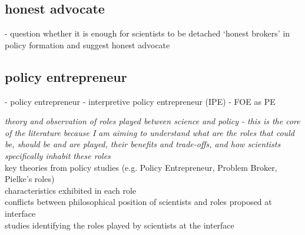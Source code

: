 \subsection{honest advocate}
\cite{GregoryBW2024} - question whether it is enough for scientists to be detached `honest brokers' in policy formation and suggest honest advocate

\subsection{policy entrepreneur}
\cite{Cairney2018} - policy entrepreneur
\cite{AukesLB2018} - interpretive policy entrepreneur (IPE)
\cite{CarterC2018} - FOE as PE

\emph{theory and observation of roles played between science and policy - this is the core of the literature because I am aiming to understand what are the roles that could be, should be and are played, their benefits and trade-offs, and how scientists specifically inhabit these roles}\\
key theories from policy studies (e.g. Policy Entrepreneur, Problem Broker, Pielke’s roles)\\
characteristics exhibited in each role\\
conflicts between philosophical position of scientists and roles proposed at interface\\
studies identifying the roles played by scientists at the interface


